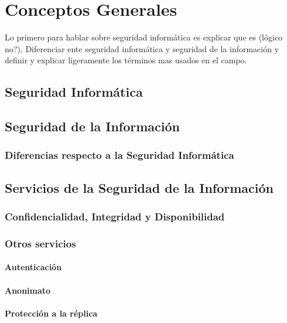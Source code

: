 \chapter{Conceptos Generales}

{\color{red} Lo primero para hablar sobre seguridad informática es explicar que es (lógico no?). Diferenciar ente seguridad informática y seguridad de la información y definir y explicar ligeramente los términos mas usados en el campo.}

\section{Seguridad Informática}


\section{Seguridad de la Información}

\subsection{Diferencias respecto a la Seguridad Informática}


\section{Servicios de la Seguridad de la Información}

\subsection[CID]{Confidencialidad, Integridad y Disponibilidad}

\subsection{Otros servicios}

\subsubsection{Autenticación}

\subsubsection{Anonimato}

\subsubsection{Protección a la réplica}